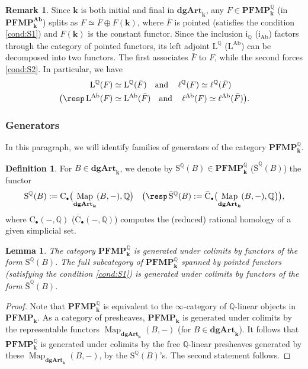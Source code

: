 \documentclass[JEP,XML,SOM,Unicode,NoEqCountersInSection]{cedram}
\let\widebar\bar
\newcounter{condition}
\newcommand{\sbullet}{{\scriptscriptstyle\bullet}}
\newtheorem{lem}[thm]{Lemma}
\theoremstyle{definition}
\newtheorem{df}[thm]{Definition}
\newtheorem{rmq}[thm]{Remark}
\newcommand{\Q}{\mathbb{Q}}
\newcommand{\dgArt}{\mathbf{dgArt}}
\DeclareMathOperator{\Map}{Map}
\newcommand{\Ab}{\mathbf{Ab}}
\renewcommand{\k}{{\boldsymbol{k}}}
\newcommand{\iAb}{\operatorname{i_{Ab}}}
\newcommand{\iQ}{\operatorname{i_{\Q}}}
\newcommand{\ellAb}{\operatorname{\ell^{Ab}}}
\newcommand{\ellQ}{\operatorname{\ell^\Q}}
\newcommand{\SQ}{\operatorname{S^\Q}}
\newcommand{\SQb}{\operatorname{{\bar S}^\Q}}
\newcommand{\LAb}{\operatorname{L^{Ab}}}
\newcommand{\LQ}{\operatorname{L^{\Q}}}
\newcommand{\PFMP}{\mathbf{PFMP}}
\begin{document}
\begin{rmq}\label{rmq:lbar}
Since $\k$ is both initial and final in $\dgArt_\k$, any $F \in \PFMP_\k^\Q$ (\resp in $\PFMP_\k^\Ab$) splits as $F \simeq \widebar F \oplus F(\k)$, where $\widebar F$ is pointed (\ie satisfies the condition \eqref{cond:S1}) and $F(\k)$ is the constant functor.
Since the inclusion $\iQ$ (\resp $\iAb$) factors through the category of pointed functors, its left adjoint $\LQ$ (\resp $\LAb$) can be decomposed into two functors. The first associates $\widebar F$ to $F$, while the second forces \eqref{cond:S2}.
In particular, we have
\begin{align*}
\LQ(F) &\simeq \LQ(\widebar F) \quad\text{and}\quad \ellQ(F) \simeq \ellQ(\widebar F) \\
\bigl(\resp \LAb(F) &\simeq \LAb(\widebar F) \quad\text{and}\quad \ellAb(F) \simeq \ellAb(\widebar F) \bigr).
\end{align*}
\end{rmq}

\subsubsection{Generators}
In this paragraph, we will identify families of generators of the category $\PFMP_\k^\Q$.
\begin{df}
For $B \in \dgArt_\k$, we denote by $\SQ(B) \in \PFMP_\k^\Q$ (\resp $\SQb(B)$) the functor
\[
\SQ(B) := \mathrm{C}_\sbullet \bigl( \Map_{\dgArt_\k}(B,-), \Q \bigr) \quad \bigl(\resp 
\SQb(B) := \widebar{\mathrm{C}}_\sbullet \bigl( \Map_{\dgArt_\k}(B,-), \Q \bigr) \bigr),
\]
where $\mathrm{C}_\sbullet(-,\Q)$ (\resp $\widebar{\mathrm{C}}_\sbullet(-,\Q)$) computes the (reduced) rational homology of a given simplicial set.
\end{df}

\begin{lem}\label{lem:generateurs}
The category $\PFMP_\k^\Q$ is generated under colimits by functors of the form $\SQ(B)$.
The full subcategory of $\PFMP_\k^\Q$ spanned by pointed functors (\ie satisfying the condition \eqref{cond:S1}) is generated under colimits by functors of the form $\SQb(B)$.
\end{lem}

\begin{proof}
Note that $\PFMP_\k^\Q$ is equivalent to the $\infty$-category of $\Q$-linear objects in $\PFMP_\k$. As a category of presheaves, $\PFMP_\k$ is generated under colimits by the representable functors $\Map_{\dgArt_\k}(B,-)$ (for $B \in \dgArt_\k$).
It follows that $\PFMP_\k^\Q$ is generated under colimits by the free $\Q$-linear presheaves generated by these $\Map_{\dgArt_\k}(B,-)$, \ie by the $\SQ(B)$'s.
The second statement follows.
\end{proof}
\end{document}
